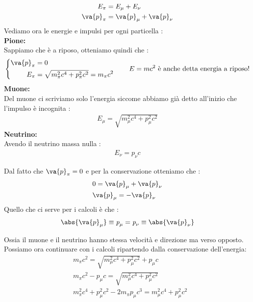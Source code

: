 \documentclass[a4paper, 12pt, twoside]{report}
\begin{document}
\begin{align*}
        E_{\pi} &= E_{\mu} + E_{\nu} \\
        \va{p}_{\pi} &= \va{p}_{\mu} + \va{p}_{\nu}
\end{align*}
Vediamo ora le energie e impulsi per ogni particella : \\
\textbf{Pione:} \\
Sappiamo che è a riposo, otteniamo quindi che : 
\begin{equation*}
        \left\{ \begin{aligned}
                        \va{p}_{\pi} &= 0 \\
                        E_{\pi} &= \sqrt{m^2_{\pi}c^4 + \textit{p}_{\pi}^2c^2} = m_{\pi}c^2 
                \end{aligned}
                \right.
                \qquad \text{$E=mc^2$ è anche detta energia a riposo!}
\end{equation*}
\textbf{Muone:}\\
Del muone ci scriviamo solo l'energia siccome abbiamo già detto all'inizio che l'impulso è incognita : 
\begin{align*}
    E_{\mu} = \sqrt{m_{\mu}^2c^4 + \textit{p}_{\mu}^2c^2}
\end{align*}
\textbf{Neutrino:}\\
Avendo il neutrino massa nulla : 
\begin{align*}
    E_{\nu} = \textit{p}_{\nu}c
\end{align*}
\begin{tcolorbox}[colback=red!5!white,colframe=red!50!black,title=ATTENZIONE !]
        Dal fatto che $\va{p}_{\pi} = 0$ e per la conservazione otteniamo che : 
        \begin{align*}
                &0 = \va{p}_{\mu} + \va{p}_{\nu} \\
                &\va{p}_{\mu} = -\va{p}_{\nu} 
        \end{align*}
        Quello che ci serve per i calcoli è che : 
        \begin{align*}
            \abs{\va{p}_{\mu}} \equiv \textit{p}_{\mu} = \textit{p}_{\nu} \equiv \abs{\va{p}_{\nu}}
        \end{align*}
\end{tcolorbox}
Ossia il muone e il neutrino hanno stessa velocità e direzione ma verso opposto. \\
Possiamo ora continuare con i calcoli ripartendo dalla conservazione dell'energia: 
\begin{align*}
        &m_{\pi}c^2 = \sqrt{m_{\mu}^2c^4 + \textit{p}_{\mu}^2c^2} + \textit{p}_{\mu}c\\
        &m_{\pi}c^2 - \textit{p}_{\mu}c =\sqrt{m_{\mu}^2c^4 +\textit{p}_{\mu}^2c^2 }\\ 
        &m_{\pi}^2c^4 + \textit{p}_{\mu}^2c^2 - 2m_{\pi}\textit{p}_{\mu}c^3 = m_{\mu}^2c^4 +\textit{p}_{\mu}^2c^2
\end{align*}
\end{document}
